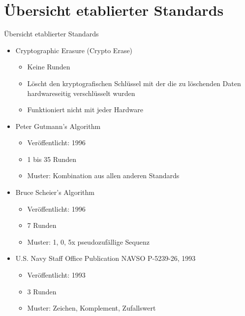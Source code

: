 \documentclass{beamer}
\begin{document}
\section{Übersicht etablierter Standards}
\begin{frame}{Übersicht etablierter Standards}
	\begin{itemize}
		\item Cryptographic Erasure (Crypto Erase)
			\begin{itemize}
				\item Keine Runden
				\item Löscht den kryptografischen Schlüssel mit der die zu
					löschenden Daten hardwareseitig verschlüsselt wurden
				\item Funktioniert nicht mit jeder Hardware
			\end{itemize}
		\item Peter Gutmann's Algorithm
			\begin{itemize}
				\item Veröffentlicht: 1996
				\item 1 bis 35 Runden
				\item Muster: Kombination aus allen anderen Standards
			\end{itemize}
		\item Bruce Scheier's Algorithm
			\begin{itemize}
				\item Veröffentlicht: 1996
				\item 7 Runden
				\item Muster: 1, 0, 5x pseudozufällige Sequenz
			\end{itemize}
		\item U.S. Navy Staff Office Publication NAVSO P-5239-26, 1993
			\begin{itemize}
				\item Veröffentlicht: 1993
				\item 3 Runden
				\item Muster: Zeichen, Komplement, Zufallswert
			\end{itemize}
	\end{itemize}
\end{frame}
\end{document}
